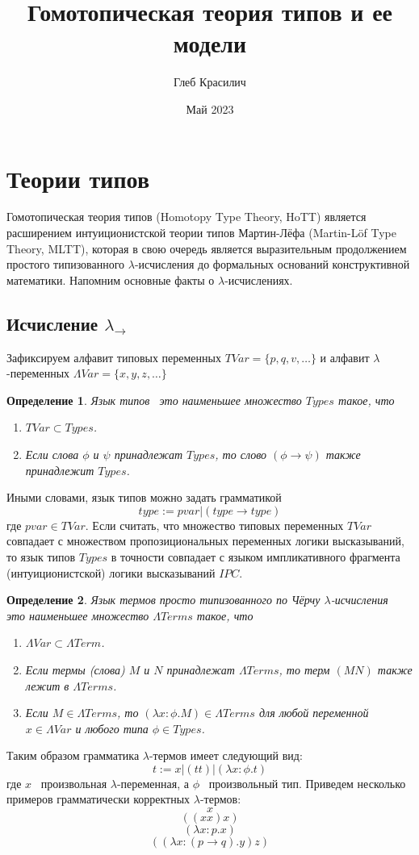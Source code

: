 \documentclass{article}[14pt]
\title{Гомотопическая теория типов и ее модели}
\author{Глеб Красилич}
\date{Май 2023}
\newtheorem{definition}{Определение}
\newcommand{\dash}{\textemdash\ }
\begin{document}
\maketitle

\section{Теории типов}

Гомотопическая теория типов (Homotopy Type Theory, HoTT) является расширением интуиционистской теории типов
Мартин-Лёфа (Martin-Löf Type Theory, MLTT), которая в свою очередь является выразительным
продолжением простого типизованного $\lambda$-исчисления до формальных оснований конструктивной математики.
Напомним основные факты о $\lambda$-исчислениях.

\subsection{Исчисление $\lambda_\rightarrow$}

Зафиксируем алфавит типовых переменных $TVar = \{p, q, v, \dots \}$ и алфавит $\lambda$-переменных
$\Lambda Var = \{x, y, z, \dots \}$
\begin{definition}
    Язык типов \dash это наименьшее множество $Types$ такое, что
    \begin{enumerate}
        \item $TVar \subset Types$.
        \item Если слова $\phi$ и $\psi$ принадлежат $Types$, то слово $(\phi \rightarrow \psi)$
        также принадлежит $Types$.
    \end{enumerate}
\end{definition}
Иными словами, язык типов можно задать грамматикой
$$type := pvar | (type \rightarrow type)$$
где $pvar \in TVar$. Если считать, что множество типовых переменных $TVar$ совпадает с множеством
пропозициональных переменных логики высказываний, то язык типов $Types$ в точности совпадает с
языком импликативного фрагмента (интуиционистской) логики высказываний $IPC$.  

\begin{definition}
    Язык термов просто типизованного по Чёрчу $\lambda$-исчисления \dash
    это наименьшее множество $\Lambda Terms$ такое, что
    \begin{enumerate}
        \item $\Lambda Var \subset \Lambda Term$.
        \item Если термы (слова) $M$ и $N$ принадлежат $\Lambda Terms$, то терм
        $(MN)$ также лежит в $\Lambda Terms$.
        \item Если $M \in \Lambda Terms$, то $(\lambda x : \phi . M) \in \Lambda Terms$
        для любой переменной $x \in \Lambda Var$ и любого типа $\phi \in Types$.
    \end{enumerate}
\end{definition}
Таким образом грамматика $\lambda$-термов имеет следующий вид:
$$t := x | (tt) | (\lambda x : \phi . t)$$
где $x$ \dash произвольная $\lambda$-переменная, а $\phi$ \dash произвольный тип.
Приведем несколько примеров грамматически корректных $\lambda$-термов:
$$x$$
$$((xx)x)$$
$$(\lambda x : p . x)$$
$$((\lambda x : (p \rightarrow q).y)z)$$
\end{document}
